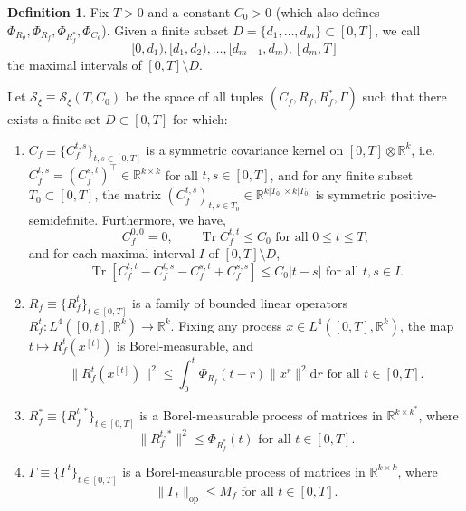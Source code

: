 \documentclass[11pt,letterpaper,reqno]{amsart}
\theoremstyle{definition}
\newtheorem{defi}[thm]{Definition}
\def\d{\mathrm{d}}
\def\R{\mathbb{R}}
\def\Tr{\operatorname{Tr}}
\def\Ct{C_\theta}
\def\Rt{R_\theta}
\def\Cf{C_f}
\def\Rf{R_f}
\def\pCt{\Phi_{\Ct}}
\def\pRt{\Phi_{\Rt}}
\def\pRf{\Phi_{\Rf}}
\def\pRfs{\Phi_{\Rf^*}}
\newcommand{\norm}[1]{\|#1\|}
\newcommand{\normop}[1]{\|#1\|_{\mathrm{op}}}
\begin{document}
\begin{defi}\label{def:S}
Fix $T>0$ and a constant $C_0>0$ (which also defines $\pRt,\pRf,\pRfs,\pCt$).
Given a finite subset $D=\{d_1,\ldots,d_m\} \subset [0,T]$, we call
\[[0,d_1),[d_1,d_2),\ldots,[d_{m-1},d_m),[d_m,T]\]
the maximal intervals of $[0,T] \setminus D$.

Let $\mathcal{S}_\xi \equiv \mathcal{S}_\xi(T,C_0)$ be the space of all
tuples $(C_f,R_f,R_f^*,\Gamma)$ such that there exists a finite set
$D \subset [0,T]$ for which:
    \begin{enumerate}
        \item $\Cf \equiv \{\Cf^{t,s}\}_{t,s \in [0,T]}$ is a symmetric covariance kernel
on $[0,T] \otimes \R^k$, i.e.\ $\Cf^{t,s}=(\Cf^{s,t})^\top
\in \R^{k \times k}$ for all $t,s \in [0,T]$,
and for any finite subset $T_0 \subset [0,T]$,
the matrix $(\Cf^{t,s})_{t,s \in T_0} \in \R^{k|T_0| \times k|T_0|}$ is
symmetric positive-semidefinite. Furthermore, we have,
\[\Cf^{0,0}=0, \qquad
\Tr \Cf^{t,t} \leq C_0 \text{ for all } 0\leq t\leq T,\]
and for each maximal interval $I$ of $[0,T]\setminus D$,
        \begin{equation}\label{eq:Cfcontinuity}
\Tr[\Cf^{t,t}-\Cf^{t,s}-\Cf^{s,t}+\Cf^{s,s}] \leq C_0|t-s|
\text{ for all } t,s \in I.
        \end{equation}
        \item $\Rf \equiv \{\Rf^t\}_{t \in [0,T]}$ is a family of bounded linear operators
$\Rf^t:L^4([0,t],\R^k) \to \R^k$.
Fixing any process $x \in L^4([0,T],\R^k)$, the map
$t \mapsto R_f^t(x^{[t]})$ is Borel-measurable, and
        \begin{equation}\label{eq:pRf-volterra}
\norm{\Rf^{t}(x^{[t]})}^2 \leq \int_0^t \pRf(t-r) \norm{x^r}^2\d r \text{ for all }
t\in [0,T].
\end{equation}
\item $\Rf^* \equiv \{\Rf^{t,*}\}_{t \in [0,T]}$ is a Borel-measurable
process of matrices in $\R^{k \times k^*}$, where
\[\|\Rf^{t,*}\|^2 \leq \pRfs(t) \text{ for all } t \in [0,T].\]
\item $\Gamma \equiv \{\Gamma^t\}_{t \in [0,T]}$ is a Borel-measurable process
of matrices in $\R^{k \times k}$, where
\[\normop{\Gamma_t} \leq M_f \text{ for all } t \in [0,T].\]
    \end{enumerate}


\end{defi}
\end{document}
